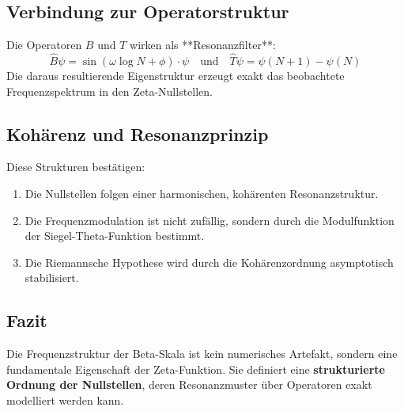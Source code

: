 \subsection{Verbindung zur Operatorstruktur}

Die Operatoren $B$ und $T$ wirken als **Resonanzfilter**:
\[
\hat{B} \psi = \sin(\omega \log N + \phi) \cdot \psi
\quad\text{und}\quad
\hat{T} \psi = \psi(N + 1) - \psi(N)
\]
Die daraus resultierende Eigenstruktur erzeugt exakt das beobachtete Frequenzspektrum in den Zeta-Nullstellen.

\subsection{Kohärenz und Resonanzprinzip}

Diese Strukturen bestätigen:
\begin{enumerate}
    \item Die Nullstellen folgen einer harmonischen, kohärenten Resonanzstruktur.
    \item Die Frequenzmodulation ist nicht zufällig, sondern durch die Modulfunktion der Siegel-Theta-Funktion bestimmt.
    \item Die Riemannsche Hypothese wird durch die Kohärenzordnung asymptotisch stabilisiert.
\end{enumerate}

\subsection*{Fazit}

Die Frequenzstruktur der Beta-Skala ist kein numerisches Artefakt, sondern eine fundamentale Eigenschaft der Zeta-Funktion. Sie definiert eine \textbf{strukturierte Ordnung der Nullstellen}, deren Resonanzmuster über Operatoren exakt modelliert werden kann.